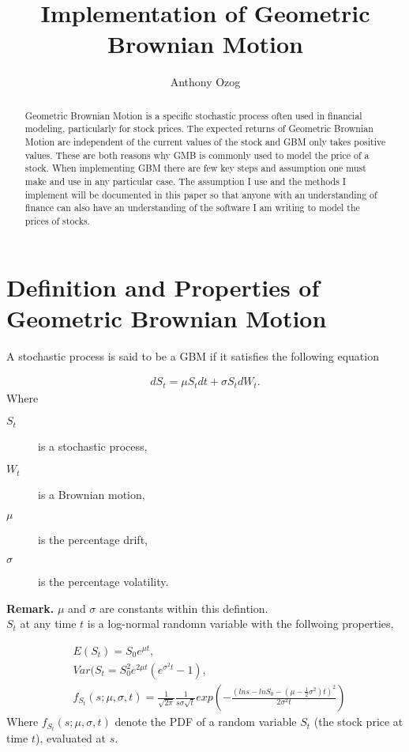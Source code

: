 \documentclass{article}
\title{Implementation of Geometric Brownian Motion}
\author{Anthony Ozog}
\begin{document}
\maketitle

\begin{abstract}
Geometric Brownian Motion is a specific stochastic process often used in financial modeling, particularly for stock prices. The expected returns of Geometric Brownian Motion are independent of the current values of the stock and GBM only takes positive values. These are both reasons why GMB is commonly used to model the price of a stock. When implementing GBM there are few key steps and assumption one must make and use in any particular case. The assumption I use and the methods I implement will be documented in this paper so that anyone with an understanding of finance can also have an understanding of the software I am writing to model the prices of stocks.
\end{abstract}

\section{Definition and Properties of Geometric Brownian Motion}
A stochastic process is said to be a GBM if it satisfies the following equation

\begin{align}
	dS_t = \mu S_t dt + \sigma S_tdW_t.
\end{align}
Where

\begin{description}
	\item[$S_t$] is a stochastic process,
	\item[$W_t$] is a Brownian motion,
	\item[$\mu$] is the percentage drift,
	\item[$\sigma$] is the percentage volatility.
\end{description}
\noindent
{\bf Remark.} $\mu$ and $\sigma$ are constants within this defintion.\\

\noindent
$S_t$ at any time $t$ is a log-normal randomn variable with the follwoing properties, 

\begin{align}
	&E(S_t) = S_0e^{\mu t},\\
	&Var(S_t = S_0^2e^{2\mu t}\left (e^{\sigma^2 t} - 1 \right),\\
	&f_{S_t}(s; \mu, \sigma, t) = \frac{1}{\sqrt{2\pi}} \frac{1}{s\sigma \sqrt t}exp\left( -\frac{(lns-ln S_0 - (\mu  - \frac{1}{2} \sigma^2 )t)^2}{2\sigma^2 t} \right)
\end{align}
\noindent
Where $f_{S_t}(s; \mu, \sigma, t)$ denote the PDF of a random variable $S_t$ (the stock price at time $t$), evaluated at $s$.
\end{document}
